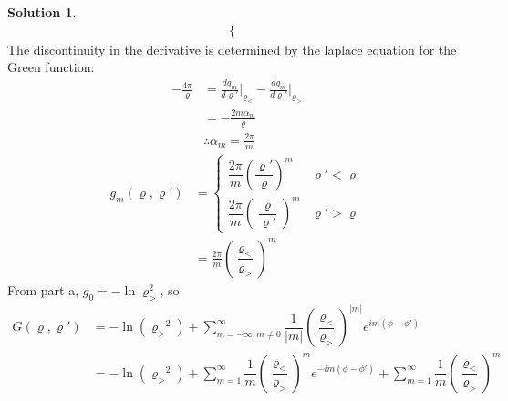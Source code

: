 \documentclass[letter,12pt]{article}
\theoremstyle{definition}
\newtheorem*{sol}{Solution}
\begin{document}
\begin{enumerate}
\begin{enumerate}
\begin{sol}
\begin{align*}
\begin{cases}
                        \end{cases}
                    \end{align*}
                    The discontinuity in the derivative is determined
                    by the laplace equation for the Green function:
                    \begin{align*}
                        - \frac{4 \pi}{\varrho}
                        &=
                        \frac{d g_m}{d\varrho'} \biggr \rvert_{\varrho_<} - 
                        \frac{d g_m}{d \varrho'} \biggr \rvert_{\varrho_>}
                        \\
                        &= -\frac{2 m \alpha_m}{\varrho}
                        \\
                        &\therefore \alpha_m = \frac{2 \pi}{m}
                    \end{align*}
                    \begin{align*}
                        g_m(\varrho, \varrho') &=
                        \begin{cases}
                            \dfrac{2 \pi}{m} {\left(\dfrac{\varrho'}{\varrho}\right)}^m & \varrho' < \varrho
                            \\
                            \dfrac{2 \pi}{m} {\left(\dfrac{\varrho}{\varrho'}\right)}^m & \varrho' > \varrho
                        \end{cases}
                        \\
                        &= \frac{2\pi}{m} {\left( \dfrac{\varrho_<}{\varrho_>}\right)}^m
                    \end{align*}
                    From part a, $g_0 = -\ln \varrho_>^2$, so
                    \begin{align*}
                        G(\varrho, \varrho') &= -\ln({\varrho_>}^2) +
                        \sum_{m = -\infty, m \ne 0}^{\infty}
                        \dfrac{1}{\lvert m \rvert}
                        {\left(\dfrac{\varrho_<}{\varrho_>}\right)}^{\lvert m \rvert}
                        e^{im (\phi - \phi')}
                        \\
                        &= -\ln({\varrho_>}^2) +
                        \sum_{m = 1}^{\infty}
                        \dfrac{1}{m}
                        {\left(\dfrac{\varrho_<}{\varrho_>}\right)}^{m}
                        e^{-im (\phi - \phi')}
                        +
                        \sum_{m = 1}^{\infty}
                        \dfrac{1}{m}
                        {\left(\dfrac{\varrho_<}{\varrho_>}\right)}^m

\end{align*}
\end{sol}
\end{enumerate}
\end{enumerate}
\end{document}
